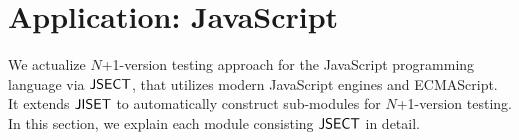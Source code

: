 \section{Application: JavaScript}\label{sec:application}

We actualize $N$+1-version testing approach for the JavaScript programming
language via $\text{\sf JSECT}$, that utilizes modern JavaScript engines and ECMAScript.
It extends $\text{\sf JISET}$ to automatically construct sub-modules for $N$+1-version
testing.  In this section, we explain each module consisting $\text{\sf JSECT}$ in detail.






